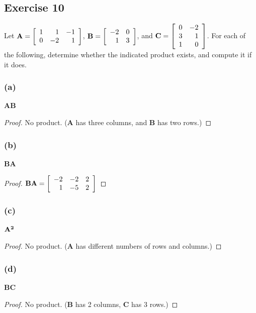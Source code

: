 \documentclass[14pt]{extarticle}
\begin{document}
\subsection{Exercise 10}
Let \({\bf A} = 
\left[ 
\begin{array}{rrr}
1 & 1 & -1 \\
0 & -2 & 1 \\
\end{array}
\right]
\), \({\bf B} = 
\left[ 
\begin{array}{rr}
-2 & 0 \\
1 & 3 \\
\end{array}
\right]
\), and \({\bf C} = 
\left[ 
\begin{array}{rr}
0 & -2 \\
3 & 1 \\
1 & 0 \\
\end{array}
\right]
\). For each of the following, determine whether the indicated product exists, and compute it if it does.

\subsubsection{(a)}
{\bf AB}
\begin{proof}
No product. ({\bf A} has three columns, and {\bf B} has two rows.)
\end{proof}

\subsubsection{(b)}
{\bf BA}
\begin{proof}
\({\bf BA} = 
\left[ 
\begin{array}{rrr}
-2 & -2 & 2 \\
1 & -5 & 2 \\
\end{array}
\right]
\)
\end{proof}

\subsubsection{(c)}
\({\bf A^2}\)
\begin{proof}
No product. ({\bf A} has different numbers of rows and columns.)
\end{proof}

\subsubsection{(d)}
{\bf BC}
\begin{proof}
No product. ({\bf B} has 2 columns, {\bf C} has 3 rows.)
\end{proof}
\end{document}
